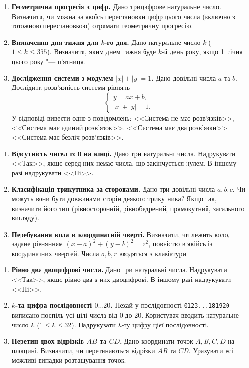 	{\large
		\begin{enumerate}
			\item \textbf{Геометрична прогресія з цифр.} Дано трицифрове натуральне число. Визначити, чи можна за якоїсь перестановки цифр цього числа (включно з тотожною перестановкою) отримати геометричну прогресію.
			\item \textbf{Визначення дня тижня для $k$-го дня.} Дано натуральне число $k$ ($1 \leqslant k \leqslant 365$). Визначити, яким днем тижня буде $k$-й день року, якщо 1~січня цього року "--- п'ятниця.
			\item \textbf{Дослідження системи з модулем $|x|+|y|=1$.} Дано довільні числа $a$ та $b$. Дослідити розв'язність системи рівнянь
			$$
			\begin{cases}
				y = ax + b, \\
				|x| + |y| = 1.
			\end{cases}
			$$
			У відповіді вивести одне з повідомлень: <<Система не має розв'язків>>, <<Система має єдиний розв'язок>>, <<Система має два розв'язки>>, <<Система має безліч розв'язків>>.
		\end{enumerate}
	}
	
	
	
	
	{\large
		\begin{enumerate}
			\item \textbf{Відсутність чисел із 0 на кінці.} Дано три натуральні числа. Надрукувати <<Так>>, якщо серед них немає числа, що закінчується нулем. В іншому разі надрукувати <<Ні>>.
			\item \textbf{Класифікація трикутника за сторонами.} Дано три довільні числа $a, b, c$. Чи можуть вони бути довжинами сторін деякого трикутника? Якщо так, визначити його тип (рівносторонній, рівнобедрений, прямокутний, загального вигляду).
			\item \textbf{Перебування кола в координатній чверті.} Визначити, чи лежить коло, задане рівнянням $(x - a)^2 + (y - b)^2 = r^2$, повністю в якійсь із координатних чвертей. Числа $a, b, r$ вводяться з клавіатури.
		\end{enumerate}
	}
	
	
	\vspace{2cm}
	
	{\large
		\begin{enumerate}
			\item \textbf{Рівно два двоцифрові числа.} Дано три натуральні числа. Надрукувати <<Так>>, якщо рівно два з них двоцифрові. В іншому разі надрукувати <<Ні>>.
			\item \textbf{$k$-та цифра послідовності $0\dots 20$.} Нехай у послідовності \texttt{0123...181920} виписано поспіль усі цілі числа від 0 до 20. Користувач вводить натуральне число $k$ ($1 \leqslant k \leqslant 32$). Надрукувати $k$-ту цифру цієї послідовності.
			\item \textbf{Перетин двох відрізків $AB$ та $CD$.} Дано координати точок $A, B, C, D$ на площині. Визначити, чи перетинаються відрізки $AB$ та $CD$. Урахувати всі можливі випадки розташування точок.
		\end{enumerate}
	}
	
